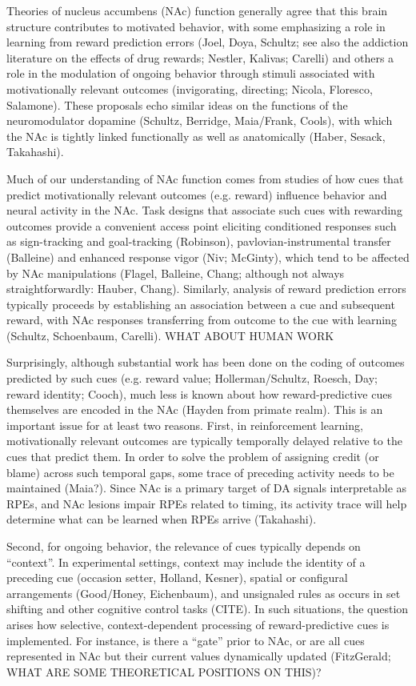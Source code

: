 \documentclass[11pt]{article}
\let\cite=\citep
\begin{document}
Theories of nucleus accumbens (NAc) function generally agree that this brain structure contributes to motivated behavior, with some emphasizing a role in learning from reward prediction errors (Joel, Doya, Schultz; see also the addiction literature on the effects of drug rewards; Nestler, Kalivas; Carelli) and others a role in the modulation of ongoing behavior through stimuli associated with motivationally relevant outcomes (invigorating, directing; Nicola, Floresco, Salamone). These proposals echo similar ideas on the functions of the neuromodulator dopamine (Schultz, Berridge, Maia/Frank, Cools), with which the NAc is tightly linked functionally as well as anatomically (Haber, Sesack, Takahashi).

Much of our understanding of NAc function comes from studies of how cues that predict motivationally relevant outcomes (e.g. reward) influence behavior and neural activity in the NAc. Task designs that associate such cues with rewarding outcomes provide a convenient access point eliciting conditioned responses such as sign-tracking and goal-tracking (Robinson), pavlovian-instrumental transfer (Balleine) and enhanced response vigor (Niv; McGinty), which tend to be affected by NAc manipulations (Flagel, Balleine, Chang; although not always straightforwardly: Hauber, Chang). Similarly, analysis of reward prediction errors typically proceeds by establishing an association between a cue and subsequent reward, with NAc responses transferring from outcome to the cue with learning (Schultz, Schoenbaum, Carelli). WHAT ABOUT HUMAN WORK

Surprisingly, although substantial work has been done on the coding of outcomes predicted by such cues (e.g. reward value; Hollerman/Schultz, Roesch, Day; reward identity; Cooch), much less is known about how reward-predictive cues themselves are encoded in the NAc (Hayden from primate realm). This is an important issue for at least two reasons. First, in reinforcement learning, motivationally relevant outcomes are typically temporally delayed relative to the cues that predict them. In order to solve the problem of assigning credit (or blame) across such temporal gaps, some trace of preceding activity needs to be maintained \cite{Lee2012} (Maia?). Since NAc is a primary target of DA signals interpretable as RPEs, and NAc lesions impair RPEs related to timing, its activity trace will help determine what can be learned when RPEs arrive (Takahashi).

Second, for ongoing behavior, the relevance of cues typically depends on “context”. In experimental settings, context may include the identity of a preceding cue (occasion setter, Holland, Kesner), spatial or configural arrangements (Good/Honey, Eichenbaum), and unsignaled rules as occurs in set shifting and other cognitive control tasks (CITE). In such situations, the question arises how selective, context-dependent processing of reward-predictive cues is implemented. For instance, is there a “gate” prior to NAc, or are all cues represented in NAc but their current values dynamically updated (FitzGerald; WHAT ARE SOME THEORETICAL POSITIONS ON THIS)? 
\end{document}
